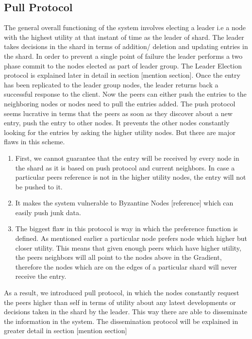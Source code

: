 \documentclass[12pt,a4paper,twoside,openright]{book}
\begin{document}
\subsection{Pull Protocol}

The general overall functioning of the system involves electing a leader i.e a node with the highest utility at that instant of time as the leader of shard. The leader takes decisions in the shard in terms of addition/ deletion and updating entries in the shard. In order to prevent a single point of failure the leader performs a two phase commit to the nodes elected as part of leader group. The Leader Election protocol is explained later in detail in section [mention section]. Once the entry has been replicated to the leader group nodes, the leader returns back a successful response to the client. Now the peers can either push the entries to the neighboring nodes or nodes need to pull the entries added. The push protocol seems lucrative in terms that the peers as soon as they discover about a new entry, push the entry to other nodes. It prevents the other nodes constantly looking for the entries by asking the higher utility nodes. But there are major flaws in this scheme.

\begin{enumerate}

\item First, we cannot guarantee that the entry will be received by every node in the shard as it is based on push protocol and current neighbors. In case a particular peers reference is not in the higher utility nodes, the entry will not be pushed to it.

\item It makes the system vulnerable to Byzantine Nodes [reference] which can easily push junk data.

\item The biggest flaw in this protocol is way in which the preference function is defined. As mentioned earlier a particular node prefers node which higher but closer utility. This means that given enough peers which have higher utility, the peers neighbors will all point to the nodes above in the Gradient, therefore the nodes which are on the edges of a particular shard will never receive the entry.

\end{enumerate} 

As a result, we introduced pull protocol, in which the nodes constantly request the peers higher than self in terms of utility about any latest developments or decisions taken in the shard by the leader. This way there are able to disseminate the information in the system. The dissemination protocol will be explained in greater detail in section [mention section]
\end{document}
